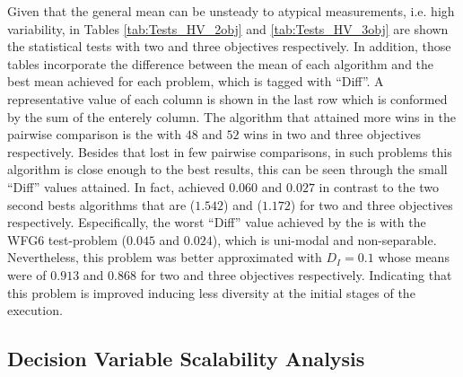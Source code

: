 Given that the general mean can be unsteady to atypical measurements, i.e. high variability, in Tables \ref{tab:Tests_HV_2obj} and \ref{tab:Tests_HV_3obj} are shown the statistical tests with two and three objectives respectively.
%
In addition, those tables incorporate the difference between the mean of each algorithm and the best mean achieved for each problem, which is tagged with ``Diff''.
%
A representative value of each column is shown in the last row which is conformed by the sum of the enterely column.
%
The algorithm that attained more wins in the pairwise comparison is the \VSDMOEA{} with $48$ and $52$ wins in two and three objectives respectively.
%
Besides that \VSDMOEA{} lost in few pairwise comparisons, in such problems this algorithm is close enough to the best results, this can be seen through the small ``Diff'' values attained.
%
In fact, \VSDMOEA{} achieved $0.060$ and $0.027$ in contrast to the two second bests algorithms that are \NSGAII{} ($1.542$) and \RMOEA{} ($1.172$) for two and three objectives respectively.
%
Especifically, the worst ``Diff'' value achieved by the \VSDMOEA{} is with the WFG6 test-problem ($0.045$ and $0.024$), which is uni-modal and non-separable.
%
Nevertheless, this problem was better approximated with $D_I=0.1$ whose means were of $0.913$ and $0.868$ for two and three objectives respectively.
%
Indicating that this problem is improved inducing less diversity at the initial stages of the execution.
%

\subsection{Decision Variable Scalability Analysis}

